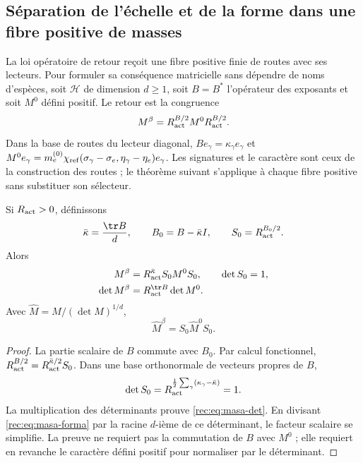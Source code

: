 \subsection{Séparation de l’échelle et de la forme dans une fibre positive de masses}

La loi opératoire de retour reçoit une fibre positive finie de routes avec ses lecteurs. Pour formuler sa conséquence matricielle sans dépendre de noms d’espèces, soit \(\mathcal H\) de dimension \(d\ge1\), soit \(B=B^*\) l’opérateur des exposants et soit \(M^0\) défini positif. Le retour est la congruence
\begin{equation}
 M^\beta=R_{\rm act}^{B/2}M^0R_{\rm act}^{B/2}.
 \label{rec:eq:masa-operador}
\end{equation}
Dans la base de routes du lecteur diagonal, \(Be_\gamma=\kappa_\gamma e_\gamma\) et
\(M^0e_\gamma=m_e^{(0)}\chi_{\rm ref}(\sigma_\gamma-\sigma_e,\eta_\gamma-\eta_e)e_\gamma\). Les signatures et le caractère sont ceux de la construction des routes ; le théorème suivant s’applique à chaque fibre positive sans substituer son sélecteur.


\begin{theorem}
\label{rec:thm:masa}
Si \(R_{\rm act}>0\), définissons
\[
 \bar\kappa=\frac{\tr B}{d},\qquad B_0=B-\bar\kappa I,
 \qquad S_0=R_{\rm act}^{B_0/2}.
\]
Alors
\begin{align}
 M^\beta&=R_{\rm act}^{\bar\kappa}S_0M^0S_0,
 \qquad\det S_0=1,\label{rec:eq:masa-forma}\\
 \det M^\beta&=R_{\rm act}^{\tr B}\det M^0.\label{rec:eq:masa-det}
\end{align}
Avec \(\widehat M=M/(\det M)^{1/d}\),
\begin{equation}
 \widehat M^\beta=S_0\widehat M^0S_0.
 \label{rec:eq:masa-normalizada}
\end{equation}
\end{theorem}
\begin{proof}
La partie scalaire de \(B\) commute avec \(B_0\). Par calcul fonctionnel, \(R_{\rm act}^{B/2}=R_{\rm act}^{\bar\kappa/2}S_0\). Dans une base orthonormale de vecteurs propres de \(B\),
\[
 \det S_0=R_{\rm act}^{\frac12\sum_\gamma(\kappa_\gamma-\bar\kappa)}=1.
\]
La multiplication des déterminants prouve \eqref{rec:eq:masa-det}. En divisant \eqref{rec:eq:masa-forma} par la racine \(d\)-ième de ce déterminant, le facteur scalaire se simplifie. La preuve ne requiert pas la commutation de \(B\) avec \(M^0\) ; elle requiert en revanche le caractère défini positif pour normaliser par le déterminant.
\end{proof}

